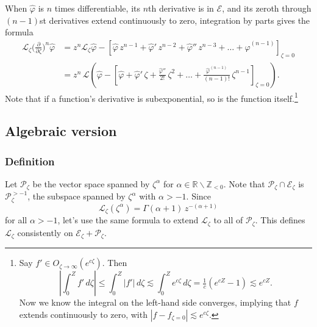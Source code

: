 \documentclass{article}
\newcommand{\maps}{\colon}
\newcommand{\Z}{\mathbb{Z}}
\newcommand{\R}{\mathbb{R}}
\newcommand{\C}{\mathbb{C}}
\newcommand{\laplace}{\mathcal{L}}
\begin{document}
When $\hat{\varphi}$ is $n$ times differentiable, its $n$th derivative is in $\mathcal{E}$, and its zeroth through $(n - 1)$st derivatives extend continuously to zero, integration by parts gives the formula
\begin{align}\label{id:L-diff}
\laplace_\zeta \big(\tfrac{\partial}{\partial \zeta}\big)^n \hat{\varphi} & = z^n \laplace_\zeta \hat{\varphi} - \left[ \hat{\varphi}\,z^{n-1} + \hat{\varphi}'\,z^{n-2} + \hat{\varphi}''\,z^{n-3} + \ldots + \hat{\varphi}^{(n-1)} \right]_{\zeta = 0} \\
& = z^n\,\laplace\left( \hat{\varphi} - \left[ \hat{\varphi} + \hat{\varphi}'\,\zeta + \tfrac{\hat{\varphi}''}{2!}\,\zeta^2 + \ldots + \tfrac{\hat{\varphi}^{(n-1)}}{(n-1)!}\,\zeta^{n-1} \right]_{\zeta = 0} \right). \nonumber
\end{align}
Note that if a function's derivative is subexponential, so is the function itself.\footnote{Say $f' \in O_{\zeta \to \infty}(e^{c\zeta})$. Then \[ \left|\int_0^Z f'\,d\zeta\right| \le \int_0^Z |f'|\,d\zeta \lesssim \int_0^Z e^{c\zeta}\,d\zeta = \tfrac{1}{c}(e^{cZ} - 1) \lesssim e^{cZ}.\] Now we know the integral on the left-hand side converges, implying that $f$ extends continuously to zero, with $|f - f_{\zeta = 0}| \lesssim e^{c\zeta}$.}


\subsection{Algebraic version}
\subsubsection{Definition}
Let $\mathcal{P}_\zeta$ be the vector space spanned by $\zeta^\alpha$ for $\alpha \in \R \smallsetminus \Z_{< 0}$. Note that $\mathcal{P}_\zeta \cap \mathcal{E}_\zeta$ is $\mathcal{P}_\zeta^{> -1}$, the subspace spanned by $\zeta^\alpha$ with $\alpha > -1$. Since
\[ \laplace_\zeta(\zeta^\alpha) = \Gamma(\alpha+1)\,z^{-(\alpha + 1)} \]
for all $\alpha > -1$, let's use the same formula to extend $\laplace_\zeta$ to all of $\mathcal{P}_\zeta$. This defines $\laplace_\zeta$ consistently on $\mathcal{E}_\zeta + \mathcal{P}_\zeta$.
\end{document}
